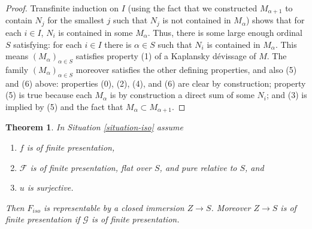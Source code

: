 \documentclass{amsart}
\theoremstyle{plain}
\newtheorem{theorem}[subsection]{Theorem}
\theoremstyle{definition}
\theoremstyle{remark}
\numberwithin{equation}{subsection}
\begin{document}
\begin{proof}
\medskip\noindent
Transfinite induction on $I$ (using the fact that we constructed
$M_{\alpha + 1}$
to contain $N_j$ for the smallest $j$ such that $N_j$ is not contained in
$M_{\alpha}$) shows that for each $i \in I$, $N_i$ is contained in some
$M_{\alpha}$.  Thus, there is some large enough ordinal $S$ satisfying: for
each $i \in I$ there is $\alpha \in S$ such that $N_i$ is contained in
$M_{\alpha}$.  This means $(M_{\alpha})_{\alpha \in S}$ satisfies property (1)
of a Kaplansky d\'evissage of $M$.  The family $(M_{\alpha})_{\alpha \in S}$
moreover satisfies the other defining properties, and also (5) and (6) above:
properties (0), (2), (4), and (6) are clear by construction;  property (5) is
true because each $M_{\alpha}$ is by construction a direct sum of some $N_i$;
and (3) is implied by (5) and the fact that $M_{\alpha} \subset M_{\alpha + 1}$.
\end{proof}


\begin{theorem}
\label{theorem-flattening-map}
In
Situation \ref{situation-iso}
assume
\begin{enumerate}
\item $f$ is of finite presentation,
\item $\mathcal{F}$ is of finite presentation, flat over $S$, and
pure relative to $S$, and
\item $u$ is surjective.
\end{enumerate}
Then $F_{iso}$ is representable by a closed immersion $Z \to S$.
Moreover $Z \to S$ is of finite presentation if $\mathcal{G}$ is
of finite presentation.
\end{theorem}
\end{document}
